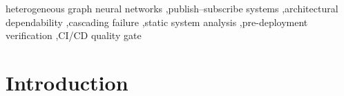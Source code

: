 \documentclass[review]{elsarticle}
\begin{document}
\begin{frontmatter}
\begin{keyword}
heterogeneous graph neural networks \sep publish--subscribe systems \sep architectural
dependability \sep cascading failure \sep static system analysis \sep pre-deployment verification
\sep CI/CD quality gate
\end{keyword}

\end{frontmatter}


\section{Introduction}
\end{document}
